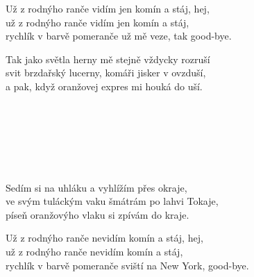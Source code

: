 
\ve{}
Už z rodnýho ranče vidím jen komín a stáj, hej,\\
už z rodnýho ranče vidím jen komín a stáj,\\
rychlík v barvě pomeranče už mě veze, tak good-bye.

\ve{}
Tak jako světla herny mě stejně vždycky rozruší\\
svit brzdařský lucerny, komáři jisker v ovzduší,\\
a pak, když oranžovej expres mi houká do uší.

\textit{\\
\\
\\
\\
\\
}

\ve{}
Sedím si na uhláku a vyhlížím přes okraje,\\
ve svým tuláckým vaku šmátrám po lahvi Tokaje,\\
píseň oranžovýho vlaku si zpívám do kraje.

\ve{}
Už z rodnýho ranče nevidím komín a stáj, hej,\\
už z rodnýho ranče nevidím komín a stáj,\\
rychlík v barvě pomeranče sviští na New York, good-bye.

\esong